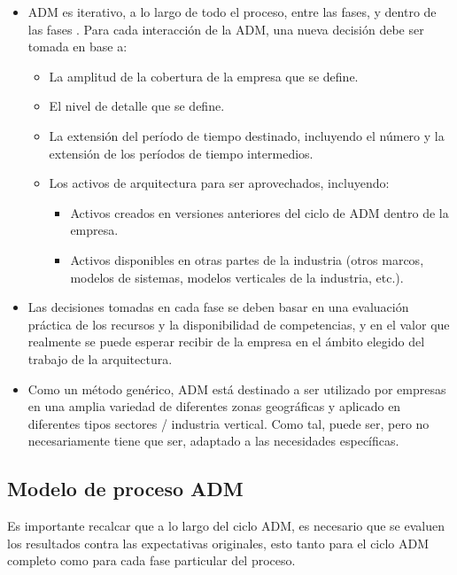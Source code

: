 \begin{itemize}
	\item ADM es iterativo, a lo largo de todo el proceso, entre las fases, y dentro de las fases . Para cada interacción de la ADM, una nueva decisión debe ser tomada en base a:
	\begin{itemize}
		\item La amplitud de la cobertura de la empresa que se define.
		\item El nivel de detalle que se define.
		\item La extensión del período de tiempo destinado, incluyendo el número y la extensión de los períodos de tiempo intermedios.
		\item Los activos de arquitectura para ser aprovechados, incluyendo:
		\begin{itemize}
			\item Activos creados en versiones anteriores del ciclo de ADM dentro de la empresa.
			\item Activos disponibles en otras partes de la industria (otros marcos, modelos de sistemas, modelos verticales de la industria, etc.).
		\end{itemize}
	\end{itemize}
	\item Las decisiones tomadas en cada fase se deben basar en una evaluación práctica de los recursos y la disponibilidad de competencias, y en el valor que realmente se puede esperar recibir de la empresa en el ámbito elegido del trabajo de la arquitectura.
	\item Como un método genérico, ADM está destinado a ser utilizado por empresas en una amplia variedad de diferentes zonas geográficas y aplicado en diferentes tipos sectores / industria vertical. Como tal, puede ser, pero no necesariamente tiene que ser, adaptado a las necesidades específicas.
\end{itemize}

\newpage
\subsection{Modelo de proceso ADM}

Es importante recalcar que a lo largo del ciclo ADM, es necesario que se evaluen los resultados contra las expectativas originales, esto tanto para el ciclo ADM completo como para cada fase particular del proceso. \cite{togaf2}

